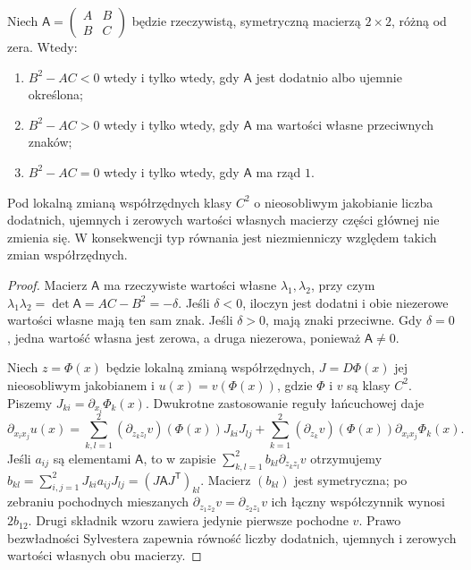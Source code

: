 \begin{stwierdzenie}
Niech $\mathsf A=\begin{pmatrix}A&B\\B&C\end{pmatrix}$
będzie rzeczywistą, symetryczną macierzą $2\times2$, różną od zera.
Wtedy:
\begin{enumerate}
\item $B^2-AC<0$ wtedy i tylko wtedy, gdy $\mathsf A$ jest
 dodatnio albo ujemnie określona;
\item $B^2-AC>0$ wtedy i tylko wtedy, gdy $\mathsf A$ ma
 wartości własne przeciwnych znaków;
\item $B^2-AC=0$ wtedy i tylko wtedy, gdy $\mathsf A$ ma rząd $1$.
\end{enumerate}
Pod lokalną zmianą współrzędnych klasy $C^2$ o nieosobliwym
jakobianie liczba dodatnich, ujemnych i zerowych wartości własnych
macierzy części głównej nie zmienia się. W konsekwencji typ
równania jest niezmienniczy względem takich zmian współrzędnych.
\end{stwierdzenie}
\begin{proof}
Macierz $\mathsf A$ ma rzeczywiste wartości własne
$\lambda_1,\lambda_2$, przy czym
$\lambda_1\lambda_2=\det\mathsf A=AC-B^2=-\delta$.
Jeśli $\delta<0$, iloczyn jest dodatni i obie niezerowe
wartości własne mają ten sam znak. Jeśli $\delta>0$,
mają znaki przeciwne. Gdy $\delta=0$, jedna wartość własna
jest zerowa, a druga niezerowa, ponieważ $\mathsf A\ne0$.

Niech $z=\Phi(x)$ będzie lokalną zmianą współrzędnych,
$J=D\Phi(x)$ jej nieosobliwym jakobianem i
$u(x)=v(\Phi(x))$, gdzie $\Phi$ i $v$ są klasy $C^2$.
Piszemy $J_{ki}=\partial_{x_i}\Phi_k(x)$.
Dwukrotne zastosowanie reguły łańcuchowej daje
\[
 \partial_{x_i x_j}u(x)=
 \sum_{k,l=1}^2(\partial_{z_k z_l}v)(\Phi(x))J_{ki}J_{lj}
 +\sum_{k=1}^2(\partial_{z_k}v)(\Phi(x))
       \partial_{x_i x_j}\Phi_k(x).
\]
Jeśli $a_{ij}$ są elementami $\mathsf A$, to w zapisie
$\sum_{k,l=1}^2 b_{kl}\partial_{z_k z_l}v$ otrzymujemy
$b_{kl}=\sum_{i,j=1}^2J_{ki}a_{ij}J_{lj}=(J\mathsf A J^{\mathsf T})_{kl}$.
Macierz $(b_{kl})$ jest symetryczna; po zebraniu pochodnych
mieszanych $\partial_{z_1z_2}v=\partial_{z_2z_1}v$ ich łączny
współczynnik wynosi $2b_{12}$.
Drugi składnik wzoru zawiera jedynie pierwsze pochodne $v$.
Prawo bezwładności
Sylvestera zapewnia równość liczby dodatnich, ujemnych
i zerowych wartości własnych obu macierzy.
\end{proof}

